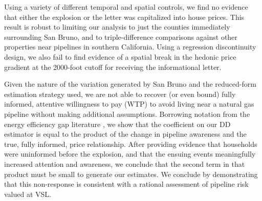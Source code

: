 \documentclass[12pt]{article}
\begin{document}
Using a variety of different temporal and spatial controls, we find no evidence that either the explosion or the letter was capitalized into house prices. This result is robust to limiting our analysis to just the counties immediately surrounding San Bruno, and to triple-difference comparisons against other properties near pipelines in southern California. Using a regression discontinuity design, we also fail to find evidence of a spatial break in the hedonic price gradient at the 2000-foot cutoff for receiving the informational letter. 

Given the nature of the variation generated by San Bruno and the reduced-form estimation strategy used, we are not able to recover (or even bound) fully informed, attentive willingness to pay (WTP) to avoid living near a natural gas pipeline without making additional assumptions. Borrowing notation from the energy efficiency gap literature \citep{allcott_is_2012}, we show that the coefficient on our DD estimator is equal to the product of the change in pipeline awareness and the true, fully informed, price relationship. After providing evidence that households were uninformed before the explosion, and that the ensuing events meaningfully increased attention and awareness, we conclude that the second term in that product must be small to generate our estimates. We conclude by demonstrating that this non-response is consistent with a rational assessment of pipeline risk valued at VSL. 
\end{document}
